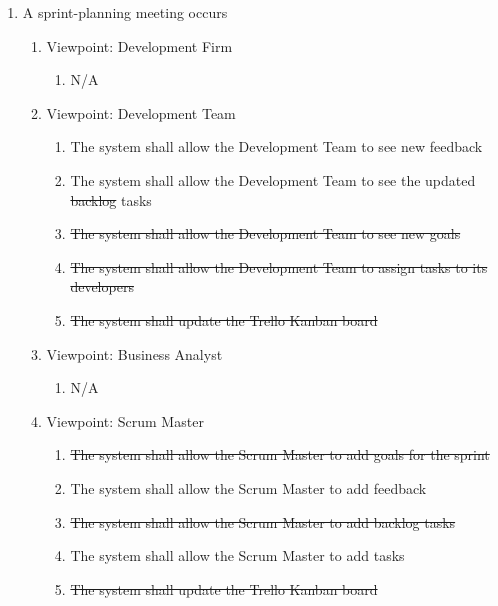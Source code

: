 \documentclass[12pt, titlepage]{article}
\begin{document}
\begin{enumerate}[{BE}1.]
    \item A sprint-planning meeting occurs %
    \begin{enumerate}[{VP}1.] 
        \item Viewpoint: Development Firm
            \begin{enumerate}
                \item[] N/A
            \end{enumerate}
        \item Viewpoint: Development Team
            \begin{enumerate}
                \item The system shall allow the Development Team to see new feedback
                \item The system shall allow the Development Team to see the updated \sout{backlog} tasks
                \item \sout{The system shall allow the Development Team to see new goals}
                \item \sout{The system shall allow the Development Team to assign tasks to its developers}
                \item \sout{The system shall update the Trello Kanban board}
            \end{enumerate}
        \item Viewpoint: Business Analyst
            \begin{enumerate}
                \item[] N/A
            \end{enumerate}
        \item Viewpoint: Scrum Master
            \begin{enumerate}
                \item \sout{The system shall allow the Scrum Master to add goals for the sprint}
                \item The system shall allow the Scrum Master to add feedback
                \item \sout{The system shall allow the Scrum Master to add backlog tasks}
                \item The system shall allow the Scrum Master to add tasks
                \item \sout{The system shall update the Trello Kanban board}
            \end{enumerate}
    \end{enumerate}


\end{enumerate}
\end{document}
